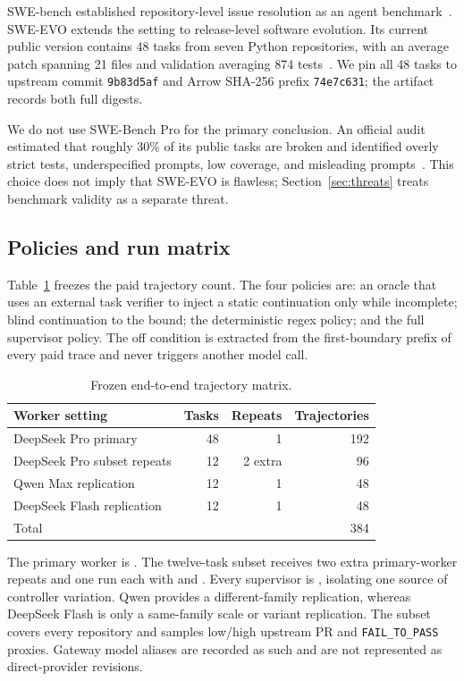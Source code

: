 \documentclass[sigconf,nonacm]{acmart}
\begin{document}
SWE-bench established repository-level issue resolution as an agent benchmark~\cite{jimenez2024swebench}. SWE-EVO extends the setting to release-level software evolution. Its current public version contains 48 tasks from seven Python repositories, with an average patch spanning 21 files and validation averaging 874 tests~\cite{le2025sweevo}. We pin all 48 tasks to upstream commit \texttt{9b83d5af} and Arrow SHA-256 prefix \texttt{74e7c631}; the artifact records both full digests.

We do not use SWE-Bench Pro for the primary conclusion. An official audit estimated that roughly 30\% of its public tasks are broken and identified overly strict tests, underspecified prompts, low coverage, and misleading prompts~\cite{openai2026signal}. This choice does not imply that SWE-EVO is flawless; Section~\ref{sec:threats} treats benchmark validity as a separate threat.

\subsection{Policies and run matrix}

Table~\ref{tab:matrix} freezes the paid trajectory count. The four policies are: an oracle that uses an external task verifier to inject a static continuation only while incomplete; blind continuation to the bound; the deterministic regex policy; and the full supervisor policy. The off condition is extracted from the first-boundary prefix of every paid trace and never triggers another model call.

\begin{table}[t]
  \caption{Frozen end-to-end trajectory matrix.}
  \label{tab:matrix}
  \centering
  \small
  \begin{tabular}{p{}rrr}
    \toprule
    Worker setting & Tasks & Repeats & Trajectories \\
    \midrule
    DeepSeek Pro primary & 48 & 1 & 192 \\
    DeepSeek Pro subset repeats & 12 & 2 extra & 96 \\
    Qwen Max replication & 12 & 1 & 48 \\
    DeepSeek Flash replication & 12 & 1 & 48 \\
    \midrule
    Total & & & 384 \\
    \bottomrule
  \end{tabular}
\end{table}

The primary worker is . The twelve-task subset receives two extra primary-worker repeats and one run each with  and . Every supervisor is , isolating one source of controller variation. Qwen provides a different-family replication, whereas DeepSeek Flash is only a same-family scale or variant replication. The subset covers every repository and samples low/high upstream PR and \texttt{FAIL\_TO\_PASS} proxies. Gateway model aliases are recorded as such and are not represented as direct-provider revisions.
\end{document}
